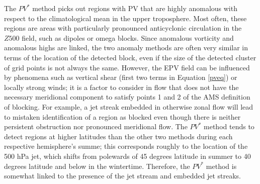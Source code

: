 \documentclass[smallextended]{svjour3}       %
\numberwithin{equation}{section}
\begin{document}
The $PV^*$ method picks out regions with PV that are highly anomalous with respect to the climatological mean in the upper troposphere. Most often, these regions are areas with particularly pronounced anticyclonic circulation in the $Z500$ field, such as dipoles or omega blocks. Since anomalous vorticity and anomalous highs are linked, the two anomaly methods are often very similar in terms of the location of the detected block, even if the size of the detected cluster of grid points is not always the same. However, the EPV field can be influenced by phenomena such as vertical shear (first two terms in Equation \ref{pveq}) or locally strong winds; it is a factor to consider in flow that does not have the necessary meridional component to satisfy points 1 and 2 of the AMS definition of blocking. For example, a jet streak embedded in otherwise zonal flow will lead to mistaken identification of a region as blocked even though there is neither persistent obstruction nor pronounced meridional flow. The $PV^*$ method tends to detect regions at higher latitudes than the other two methods during each respective hemisphere's summe; this corresponds roughly to the location of the 500 hPa jet, which shifts from polewards of 45 degrees latitude in summer to 40 degrees latitude and below in the wintertime. Therefore, the $PV^*$ method is somewhat linked to the presence of the jet stream and embedded jet streaks.

\end{document}
